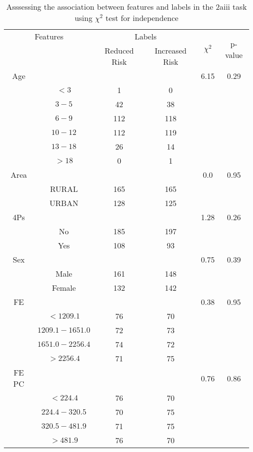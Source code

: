 \begin{table}[!htb]
\centering
\caption{Asssessing the association between features and labels in the 2aiii task using $\chi^2$ test for independence}
\label{tab:chitest_2aiii}
\begin{tabular}{c c | c c| c | c}
\hline
\multicolumn{2}{c|}{Features}& \multicolumn{2}{c|}{Labels}& \multirow{2}{*}{$\chi^2$} & \multirow{2}{*}{p-value}\\ 
& & Reduced Risk & Increased Risk & & \\ 
\hline
Age &  &  & & 6.15 & 0.29 \\ 
& $< 3$ & 1 & 0& & \\ 
& $3-5$ & 42 & 38& & \\ 
& $6-9$ & 112 & 118& & \\ 
& $10-12$ & 112 & 119& & \\ 
& $13-18$ & 26 & 14& & \\ 
& $> 18$ & 0 & 1& & \\ 
\hline 
Area &  &  & & 0.0 & 0.95 \\ 
& RURAL & 165 & 165& & \\ 
& URBAN & 128 & 125& & \\ 
\hline 
4Ps &  &  & & 1.28 & 0.26 \\ 
& No & 185 & 197& & \\ 
& Yes & 108 & 93& & \\ 
\hline 
Sex &  &  & & 0.75 & 0.39 \\ 
& Male & 161 & 148& & \\ 
& Female & 132 & 142& & \\ 
\hline 
FE &  &  & & 0.38 & 0.95 \\ 
& $< 1209.1$ & 76 & 70& & \\ 
& $1209.1-1651.0$ & 72 & 73& & \\ 
& $1651.0-2256.4$ & 74 & 72& & \\ 
& $> 2256.4$ & 71 & 75& & \\ 
\hline 
FE PC &  &  & & 0.76 & 0.86 \\ 
& $< 224.4$ & 76 & 70& & \\ 
& $224.4-320.5$ & 70 & 75& & \\ 
& $320.5-481.9$ & 71 & 75& & \\ 
& $> 481.9$ & 76 & 70& & \\ 
\hline 
\end{tabular}
\end{table}
